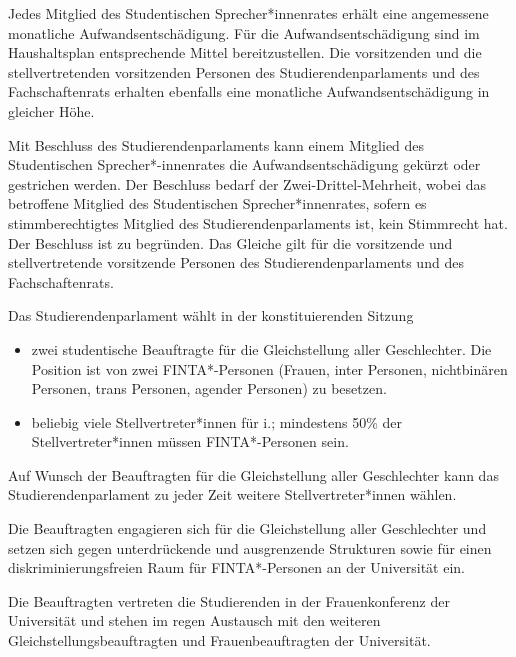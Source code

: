 \documentclass[10pt,a4paper]{scrartcl}
\begin{document}
\begin{contract}
\label{aufwandsentschaedigungen-ssr}

Jedes Mitglied des Studentischen Sprecher*innenrates erhält eine angemessene
monatliche Aufwandsentschädigung. Für die Aufwandsentschädigung sind im
Haushaltsplan entsprechende Mittel bereitzustellen. Die vorsitzenden und die
stellvertretenden vorsitzenden Personen des Studierendenparlaments und des
Fachschaftenrats erhalten ebenfalls eine monatliche Aufwandsentschädigung in
gleicher Höhe.

Mit Beschluss des Studierendenparlaments kann einem Mitglied des
Studentischen Sprecher*-innenrates die Aufwandsentschädigung gekürzt oder
gestrichen werden. Der Beschluss bedarf der Zwei-Drittel-Mehrheit, wobei das
betroffene Mitglied des Studentischen Sprecher*innenrates, sofern es
stimmberechtigtes Mitglied des Studierendenparlaments ist, kein Stimmrecht hat.
Der Beschluss ist zu begründen. Das Gleiche gilt für die vorsitzende und
stellvertretende vorsitzende Personen des Studierendenparlaments und des
Fachschaftenrats.

\label{beauftragte-fuer-die-gleichstellung-aller-geschlechter}

Das Studierendenparlament wählt in der konstituierenden Sitzung
\begin{itemize}
	\item zwei studentische Beauftragte für die Gleichstellung aller Geschlechter. Die Position ist von zwei FINTA*-Personen (Frauen, inter Personen, nichtbinären Personen, trans Personen, agender Personen) zu besetzen.
	\item beliebig viele Stellvertreter*innen für i.; mindestens 50\% der Stellvertreter*innen müssen FINTA*-Personen sein.
\end{itemize}

Auf Wunsch der Beauftragten für die Gleichstellung aller Geschlechter kann das Studierendenparlament zu jeder Zeit weitere Stellvertreter*innen wählen.

Die Beauftragten engagieren sich für die Gleichstellung aller Geschlechter und setzen sich gegen unterdrückende und ausgrenzende Strukturen sowie für einen diskriminierungsfreien Raum für FINTA*-Personen an der Universität ein.

Die Beauftragten vertreten die Studierenden in der Frauenkonferenz der Universität und stehen im regen Austausch mit den weiteren Gleichstellungsbeauftragten und Frauenbeauftragten der Universität.

\end{contract}
\end{document}
